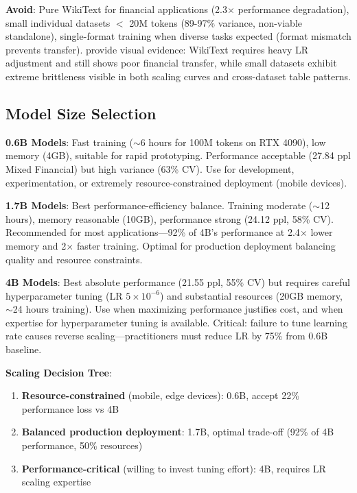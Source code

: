 \textbf{Avoid}: Pure WikiText for financial applications (2.3$\times$ performance degradation), small individual datasets $<$ 20M tokens (89-97\% variance, non-viable standalone), single-format training when diverse tasks expected (format mismatch prevents transfer).  provide visual evidence: WikiText requires heavy LR adjustment and still shows poor financial transfer, while small datasets exhibit extreme brittleness visible in both scaling curves and cross-dataset table patterns.

\subsection{Model Size Selection}

\textbf{0.6B Models}: Fast training ($\sim$6 hours for 100M tokens on RTX 4090), low memory (4GB), suitable for rapid prototyping. Performance acceptable (27.84 ppl Mixed Financial) but high variance (63\% CV). Use for development, experimentation, or extremely resource-constrained deployment (mobile devices).

\textbf{1.7B Models}: Best performance-efficiency balance. Training moderate ($\sim$12 hours), memory reasonable (10GB), performance strong (24.12 ppl, 58\% CV). Recommended for most applications—92\% of 4B's performance at 2.4$\times$ lower memory and 2$\times$ faster training. Optimal for production deployment balancing quality and resource constraints.

\textbf{4B Models}: Best absolute performance (21.55 ppl, 55\% CV) but requires careful hyperparameter tuning (LR $5 \times 10^{-6}$) and substantial resources (20GB memory, $\sim$24 hours training). Use when maximizing performance justifies cost, and when expertise for hyperparameter tuning is available. Critical: failure to tune learning rate causes reverse scaling—practitioners must reduce LR by 75\% from 0.6B baseline.

\textbf{Scaling Decision Tree}:
\begin{enumerate}
\item \textbf{Resource-constrained} (mobile, edge devices): 0.6B, accept 22\% performance loss vs 4B
\item \textbf{Balanced production deployment}: 1.7B, optimal trade-off (92\% of 4B performance, 50\% resources)
\item \textbf{Performance-critical} (willing to invest tuning effort): 4B, requires LR scaling expertise
\end{enumerate}

